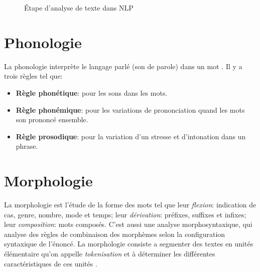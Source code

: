 \begin{figure}[htbp]
    \begin{center}
    \end{center}
    \caption{Étape d'analyse de texte dans NLP \citep{handbook-nlp}}
    \label{fig:nlp-stage}
\end{figure}

\section{Phonologie}
La phonologie interprète le langage parlé (son de parole) dans un mot \citep{natural-language-processing}. Il y a trois règles tel que:
\begin{itemize}
    \item \textbf{Règle phonétique}: pour les sons dans les mots.
    \item \textbf{Règle phonémique}: pour les variations de prononciation quand les mots son prononcé ensemble.
    \item \textbf{Règle prosodique}: pour la variation d'un stresse et d'intonation dans un phrase.
\end{itemize}

\section{Morphologie}
La morphologie est l'étude de la forme des mots tel que leur \textit{flexion}: indication de cas, genre, nombre, mode et temps; leur \textit{dérivation}: préfixes, suffixes et infixes; leur \textit{composition}: mots composés. C'est aussi une analyse morphosyntaxique, qui analyse des règles de combinaison des morphèmes selon la configuration syntaxique de l’énoncé. La morphologie consiste a segmenter des textes en unités élémentaire qu'on appelle \textit{tokenisation} et à déterminer les différentes caractéristiques de ces unités \citep{automatic-nlp,natural-language-processing}.

